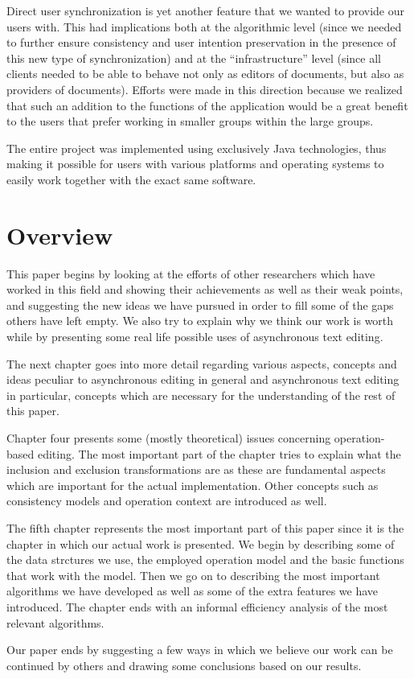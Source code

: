Direct user synchronization is yet another feature that we wanted to provide our users
with. This had implications both at the algorithmic level (since we needed to further
ensure consistency and user intention preservation in the presence of this new type of
synchronization) and at the ``infrastructure'' level (since all clients needed to be
able to behave not only as editors of documents, but also as providers of documents).
Efforts were made in this direction because we realized that such an addition to the
functions of the application would be a great benefit to the users that prefer working
in smaller groups within the large groups.

The entire project was implemented using exclusively Java technologies, thus making it
possible for users with various platforms and operating systems to easily work together
with the exact same software.

\section{Overview}

This paper begins by looking at the efforts of other researchers which have worked in this field and
showing their achievements as well as their weak points, and suggesting the new ideas we have pursued in
order to fill some of the gaps others have left empty. We also try to explain why we think our
work is worth while by presenting some real life possible uses of asynchronous text editing.

The next chapter goes into more detail regarding various aspects, concepts and ideas peculiar
to asynchronous editing in general and asynchronous text editing in particular, concepts which
are necessary for the understanding of the rest of this paper.

Chapter four presents some (mostly theoretical) issues concerning operation-based editing. The most
important part of the chapter tries to explain what the inclusion and exclusion transformations
are as these are fundamental aspects which are important for the actual implementation. Other
concepts such as consistency models and operation context are introduced as well.

The fifth chapter represents the most important part of this paper since it is the chapter in
which our actual work is presented. We begin by describing some of the data strctures we use, the
employed operation model and the basic functions that work with the model. Then we go on to
describing the most important algorithms we have developed as well as some of the extra features
we have introduced. The chapter ends with an informal efficiency analysis of the most relevant
algorithms.

Our paper ends by suggesting a few ways in which we believe our work can be continued by others
and drawing some conclusions based on our results.